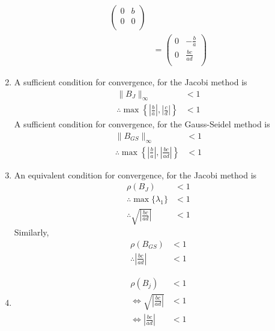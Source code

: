 \documentclass[fleqn, a4paper, 12pt, twoside]{article}
\theoremstyle{definition}
\theoremstyle{theorem}
\begin{document}
\begin{solution}
\begin{enumerate}[leftmargin=*]
\begin{align*}
					\begin{pmatrix}
						0 & b \\
						0 & 0 \\
					\end{pmatrix}\\
				&=
					\begin{pmatrix}
						0 & -\frac{b}{a}    \\
						0 & \frac{b c}{a d} \\
					\end{pmatrix}
			\end{align*}
		\item
			A sufficient condition for convergence, for the Jacobi method is
			\begin{align*}
				\|B_J\|_{\infty}                                                                        & < 1 \\
				\therefore \max\left\{ \left| \frac{b}{a} \right| , \left| \frac{c}{d} \right| \right\} & < 1
			\end{align*}
			A sufficient condition for convergence, for the Gauss-Seidel method is
			\begin{align*}
				\|B_{GS}\|_{\infty}                                                                         & < 1 \\
				\therefore \max\left\{ \left| \frac{b}{a} \right| , \left| \frac{b c}{a d} \right| \right\} & < 1
			\end{align*}
		\item
			An equivalent condition for convergence, for the Jacobi method is
			\begin{align*}
				\rho(B_J)                                        & < 1 \\
				\therefore \max\{\lambda_1\}                     & < 1 \\
				\therefore \sqrt{\left| \frac{b c}{a d} \right|} & < 1
			\end{align*}
			Similarly,
			\begin{align*}
				\rho(B_{GS})                              & < 1 \\
				\therefore \left| \frac{b c}{a d} \right| & < 1
			\end{align*}
		\item
			\begin{align*}
				\rho(B_j)                                  & < 1 \\
				\iff \sqrt{\left| \frac{b c}{a d} \right|} & < 1 \\
				\iff \left| \frac{b c}{a d} \right|        & < 1 \\

\end{align*}
\end{enumerate}
\end{solution}
\end{document}
